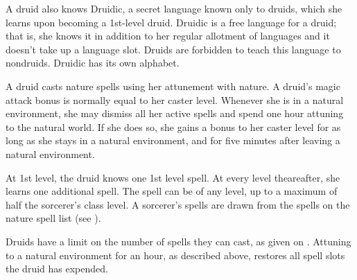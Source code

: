 A druid also knows Druidic, a secret language known only to druids, which she learns upon becoming a 1st-level druid.
Druidic is a free language for a druid; that is, she knows it in addition to her regular allotment of languages and it doesn't take up a language slot.
Druids are forbidden to teach this language to nondruids.
Druidic has its own alphabet.

A druid casts nature spells using her attunement with nature.
A druid's magic attack bonus is normally equal to her caster level.
Whenever she is in a natural environment, she may dismiss all her active spells and spend one hour attuning to the natural world.
If she does so, she gains a  bonus to her caster level for as long as she stays in a natural environment, and for five minutes after leaving a natural environment.

At 1st level, the druid knows one 1st level spell.
At every level theareafter, she learns one additional spell.
The spell can be of any level, up to a maximum of half the sorcerer's class level.
A sorcerer's spells are drawn from the spells on the nature spell list (see ).

Druids have a limit on the number of spells they can cast, as given on .
Attuning to a natural environment for an hour, as described above, restores all spell slots the druid has expended.

